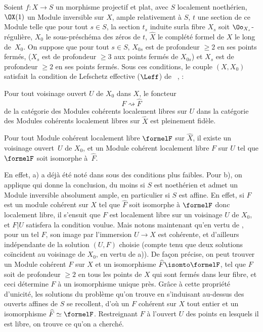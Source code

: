 \begin{corollaire} \label{XII.3.4}
Soient $f:X\to S$ un morphisme projectif et plat, avec $S$ localement noeth\'erien, $\OX(1)$ un Module inversible sur $X$, ample relativement \`a $S$, $t$ une section de ce Module telle que pour tout $s\in S$, la section $t_s$ induite sur\pageoriginale la fibre $X_s$ soit $\Oo_{X_s}$-r\'eguli\`ere, $X_0$ le sous-pr\'esch\'ema des z\'eros de $t$, $\widehat{X}$ le compl\'et\'e formel de $X$ le long de~$X_0$. On suppose que pour tout $s\in S$, $X_{0s}$ est de profondeur $\geq 2$ en ses points ferm\'es, (\ie $X_s$ est de profondeur $\geq 3$ aux points ferm\'es de $X_{0s}$) et $X_s$ est de profondeur $\geq 2$ en ses points ferm\'es. Sous ces conditions, le couple $(X, X_0)$ satisfait la condition de Lefschetz effective ($\Leff$) de ~, \ie:
\begin{enumeratea}
\item
Pour tout voisinage ouvert $U$ de $X_0$ dans $X$, le foncteur
\[
F \rightsquigarrow \widehat{F}
\]
de la cat\'egorie des Modules coh\'erents localement libres sur $U$ dans la cat\'egorie des Modules coh\'erents localement libres sur $\widehat{X}$ est pleinement fid\`ele.
\item
Pour tout Module coh\'erent localement libre $\formelF$ sur $\widehat{X}$, il existe un voisinage ouvert~$U$ de $X_0$, et un Module coh\'erent localement libre $F$ sur $U$ tel que $\formelF$ soit isomorphe \`a~$\widehat{F}$.
\end{enumeratea}
\end{corollaire}

En effet, a) a d\'ej\`a \'et\'e not\'e dans  sous des conditions plus faibles. Pour b), on applique  qui donne la conclusion, du moins si $S$ est noeth\'erien et admet un Module inversible absolument ample, en particulier si $S$ est affine. En effet, si $F$ est un module coh\'erent sur $X$ tel que $\widehat{F}$ soit isomorphe \`a $\formelF$ donc localement libre, il s'ensuit que $F$ est localement libre sur un voisinage $U$ de $X_0$, et $F|U$ satisfera la condition voulue. Mais notons maintenant qu'en vertu de , pour un tel $F$, son image par l'immersion $U\to X$ est coh\'erente, et d'ailleurs ind\'ependante de la solution $(U, F)$ choisie (compte tenu \ignorespaces que deux solutions co\"incident au voisinage de $X_0$, en vertu de a)). De fa\c con pr\'ecise, on peut trouver un Module coh\'erent $F$ sur $X$ et un isomorphisme $\widehat{F}\isomto \formelF$, tel que $F$ soit de profondeur $\geq 2$ en tous les points de $X$ qui sont ferm\'es dans leur fibre, et ceci d\'etermine $F$ \`a un isomorphisme unique pr\`es. Gr\^ace \`a cette propri\'et\'e d'unicit\'e, les solutions du probl\`eme qu'on trouve en s'induisant au-dessus des ouverts affines de $S$ se recollent, d'o\`u un $F$ coh\'erent sur $X$ tout entier et un isomorphisme $\widehat{F}\simeq \formelF$. Restreignant $F$ \`a l'ouvert $U$ des points en lesquels il est libre, on trouve ce qu'on a cherch\'e.

